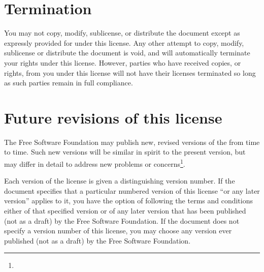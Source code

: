 \begin{multicols}{3}
\section{Termination}

You may not copy, modify, sublicense, or distribute the document except as expressly provided for under this license. Any other attempt to copy, modify, sublicense or distribute the document is void, and will automatically terminate your rights under this license. However, parties who have received copies, or rights, from you under this license will not have their licenses terminated so long as such parties remain in full compliance.

\section{Future revisions of this license}

The Free Software Foundation may publish new, revised versions of the \fdl from time to time. Such new versions will be similar in spirit to the present version, but may differ in detail to address new problems or concerns\footnote{\webCopyLeft}.

Each version of the license is given a distinguishing version number. If the document specifies that a particular numbered version of this license \enquote{or any later version} applies to it, you have the option of following the terms and conditions either of that specified version or of any later version that has been published (not as a draft) by the Free Software Foundation. If the document does not specify a version number of this license, you may choose any version ever published (not as a draft) by the Free Software Foundation.
\par \widebaselines \par
\end{multicols}
\egroup


